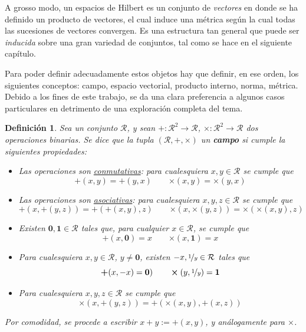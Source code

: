 \documentclass[12pt,letterpaper,draft]{book}
\newtheorem{definicion}{Definición}[chapter]
\begin{document}
A grosso modo, un espacios de Hilbert es un conjunto de \textit{vectores} en donde se ha definido un producto de vectores, el cual induce una métrica según la cual todas las sucesiones de vectores convergen.
%
Es una estructura tan general que puede ser \textit{inducida} sobre una gran variedad de conjuntos, tal como se hace en el siguiente capítulo.

Para poder definir adecuadamente estos objetos hay que definir, en ese orden, los siguientes conceptos: campo, espacio vectorial, producto interno, norma, métrica.
%
Debido a los fines de este trabajo, se da una clara preferencia a algunos casos particulares en detrimento de una exploración completa del tema.

\begin{definicion}
Sea un conjunto $\mathcal{R}$, y sean $\boldsymbol{+} : \mathcal{R}^{2} \rightarrow \mathcal{R}$, $\boldsymbol{\times} : \mathcal{R}^{2} \rightarrow \mathcal{R}$ dos operaciones binarias. 
%
Se dice que la tupla $(\mathcal{R},\boldsymbol{+},\boldsymbol{\times})$ un \textbf{campo} si cumple la siguientes propiedades:
\begin{itemize}
\item Las operaciones son \ul{conmutativas}: para cualesquiera $x, y \in \mathcal{R}$ se cumple que 
\begin{equation*}
\boldsymbol{+}(x,y) = \boldsymbol{+}(y,x) \qquad \boldsymbol{\times}(x,y) = \boldsymbol{\times}(y,x)
\end{equation*}
\item Las operaciones son \ul{asociativas}: para cualesquiera $x, y, z \in \mathcal{R}$ se cumple que 
\begin{equation*}
\boldsymbol{+}(x,\boldsymbol{+}(y,z)) = \boldsymbol{+}(\boldsymbol{+}(x,y),z) \qquad \boldsymbol{\times}(x,\boldsymbol{\times}(y,z)) = \boldsymbol{\times}(\boldsymbol{\times}(x,y),z)
\end{equation*}
\item Existen $\boldsymbol{0}, \boldsymbol{1} \in \mathcal{R}$ tales que, para cualquier $x \in \mathcal{R}$, se cumple que
\begin{equation*}
\boldsymbol{+}(x,\boldsymbol{0}) = x \qquad \boldsymbol{\times}(x,\boldsymbol{1}) = x
\end{equation*}
\item Para cualesquiera $x, y \in \mathcal{R}$, $y \neq \boldsymbol{0}$, existen $-x, \nicefrac{1}{y} \in \mathcal{R}$ tales que
\begin{equation*}
\boldsymbol{+}(x,-x)=\boldsymbol{0}) \qquad \boldsymbol{\times}(y,\nicefrac{1}{y}) = \boldsymbol{1}
\end{equation*}
\item Para cualesquiera $x, y, z \in \mathcal{R}$ se cumple que 
\begin{equation*}
\boldsymbol{\times}(x, \boldsymbol{+}(y,z)) = \boldsymbol{+}( \boldsymbol{\times}(x,y), \boldsymbol{+}(x,z) )
\end{equation*}
\end{itemize}
Por comodidad, se procede a escribir $x+y := \boldsymbol{+}(x,y)$, y análogamente para $\boldsymbol{\times}$.
\end{definicion}
\end{document}
